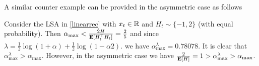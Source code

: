 A similar counter example can be provided in the asymmetric case as follows
\begin{example}
Consider the LSA in \eqref{linearrec} with $x_t\in \mathbb{R}$ and $H_t\sim \{-1, 2\}$ (with equal probability). Then 
$
\alpha_{\max}<\frac{2H}{\mathbf{E}[H_t^\top H_t]}=\frac{2}{5}
$
and since 
$
\lambda=\frac{1}{2}\log(1+\alpha)+\frac{1}{2}\log(1-\alpha 2).
$
we have $\alpha^{\lambda}_{\max}=0.78078$. It is clear that $\alpha^{\lambda}_{\max}>\alpha_{\max}$. However, in the asymmetric case we have $\frac{2}{\mathbf{E}[H]}=1>\alpha^{\lambda}_{\max}>\alpha_{\max}$.
\end{example}



